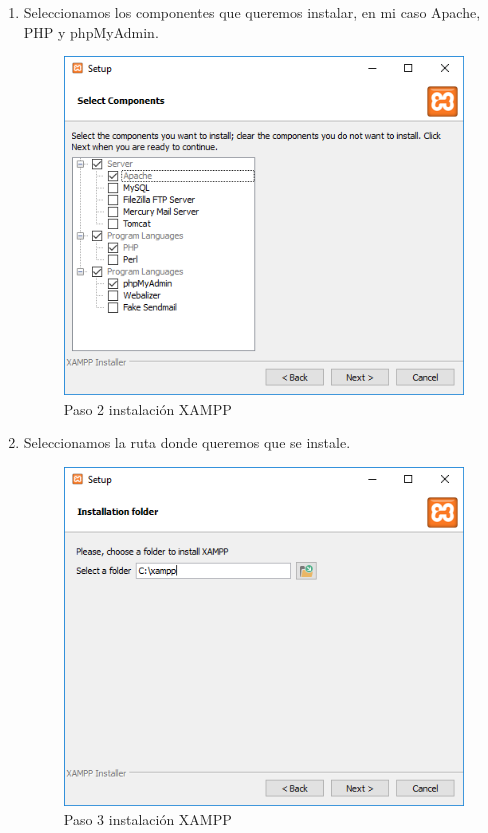 \begin{enumerate}
	\item Seleccionamos los componentes que queremos instalar, en mi caso Apache, PHP y phpMyAdmin.
	
	\begin{figure}[H] %
		\centering
		\includegraphics[scale=0.4]{pics/xampp3}  %
		\caption{Paso 2 instalación XAMPP} \label{fig:XAMPP3}
	\end{figure}
	
	\item Seleccionamos la ruta donde queremos que se instale.
	
	\begin{figure}[H] %
		\centering
		\includegraphics[scale=0.4]{pics/xampp4}  %
		\caption{Paso 3 instalación XAMPP} \label{fig:XAMPP4}
	\end{figure}
	

\end{enumerate}

